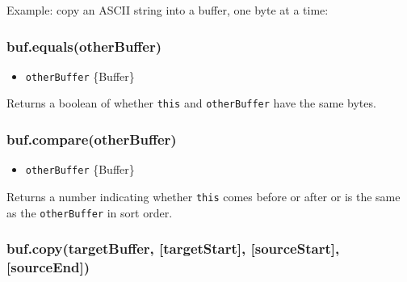 Example: copy an ASCII string into a buffer, one byte at a time:

\begin{Shaded}
\begin{Highlighting}[]
\NormalTok{;}
 \NormalTok{(}\NormalTok{);}

 \NormalTok{(}  
\NormalTok{\}}


\end{Highlighting}
\end{Shaded}

\subsubsection{buf.equals(otherBuffer)}\label{buf.equalsotherbuffer}

\begin{itemize}
\itemsep1pt\parskip0pt
\item
  \texttt{otherBuffer} \{Buffer\}
\end{itemize}

Returns a boolean of whether \texttt{this} and \texttt{otherBuffer} have
the same bytes.

\subsubsection{buf.compare(otherBuffer)}\label{buf.compareotherbuffer}

\begin{itemize}
\itemsep1pt\parskip0pt
\item
  \texttt{otherBuffer} \{Buffer\}
\end{itemize}

Returns a number indicating whether \texttt{this} comes before or after
or is the same as the \texttt{otherBuffer} in sort order.

\subsubsection{buf.copy(targetBuffer, {[}targetStart{]},
{[}sourceStart{]},
{[}sourceEnd{]})}\label{buf.copytargetbuffer-targetstart-sourcestart-sourceend}

